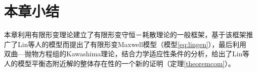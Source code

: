 

\section{本章小结}
本章利用有限形变理论建立了有限形变守恒－耗散理论的一般框架，基于该框架推广了Lin等人的模型而提出了有限形变Maxwell模型（模型\eqref{eq:lingen}），最后利用双曲—抛物方程组的Kawashima理论，结合力学适应性条件的分析，给出了Lin等人的模型平衡态附近解的整体存在性的一个新的证明（定理\ref{theoremcom}）。


% 
% 
% 
